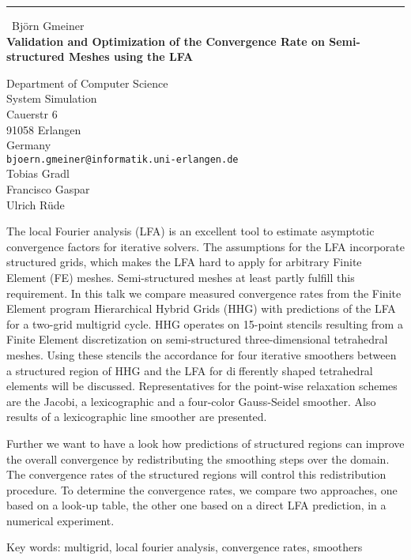 \documentclass{report}
\begin{document}
\begin{center}
\rule{6in}{1pt} \
{\large Bj\"orn Gmeiner \\
{\bf Validation and Optimization of the Convergence Rate on Semi-structured Meshes using the LFA}}

Department of Computer Science \\ System Simulation \\ Cauerstr 6 \\ 91058 Erlangen \\ Germany
\\
{\tt bjoern.gmeiner@informatik.uni-erlangen.de}\\
Tobias Gradl\\
Francisco Gaspar\\
Ulrich R\"ude\end{center}

The local Fourier analysis (LFA) is an excellent tool to estimate
asymptotic convergence factors for iterative solvers. The assumptions for
the LFA incorporate structured grids, which makes the LFA hard to apply
for arbitrary Finite Element (FE) meshes. Semi-structured meshes at least
partly fulfill this requirement. In this talk we compare measured
convergence rates from the Finite Element program Hierarchical Hybrid
Grids (HHG) with predictions of the LFA for a two-grid multigrid cycle.
HHG operates on 15-point stencils resulting from a Finite Element
discretization on semi-structured three-dimensional tetrahedral meshes.
Using these stencils the accordance for four iterative smoothers between
a structured region of HHG and the LFA for differently shaped
tetrahedral elements will be discussed. Representatives for the
point-wise relaxation schemes are the Jacobi, a lexicographic and a
four-color Gauss-Seidel smoother. Also results of a lexicographic line
smoother are presented.

Further we want to have a look how predictions of structured regions can
improve the overall convergence by redistributing the smoothing steps
over the domain. The convergence rates of the structured regions will
control this redistribution procedure. To determine the convergence
rates, we compare two approaches, one based on a look-up table, the other
one based on a direct LFA prediction, in a numerical experiment.

Key words: multigrid, local fourier analysis, convergence rates, smoothers
\end{document}
